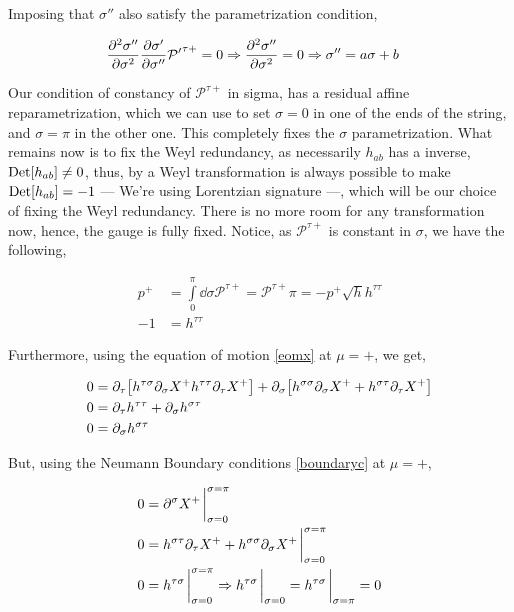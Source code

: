 Imposing that $\sigma''$ also satisfy the parametrization condition,

\begin{align*}
    {\pdv[2]{\sigma''}{\sigma}}{\pdv{\sigma'}{\sigma''}}{\mathcal P'}^{\tau+}&=0\Rightarrow {\pdv[2]{\sigma''}{\sigma}}=0\Rightarrow \sigma''=a\sigma+b
\end{align*}

Our condition of constancy of $\mathcal P^{\tau+}$ in sigma, has a residual affine reparametrization, which we can use to set $\sigma=0$ in one of the ends of the 
string, and $\sigma=\pi$ in the other one. This completely fixes the $\sigma$ parametrization. What remains now is to fix the Weyl redundancy, as necessarily 
$h_{ab}$ has a inverse, $\textup{Det} \qty[h_{ab}]\neq 0$, thus, by a Weyl transformation is always possible to make $\textup{Det} \qty[h_{ab}]=-1$ --- We're using Lorentzian signature ---, which 
will be our choice of fixing the Weyl redundancy. There is 
no more room for any transformation now, hence, the gauge is fully fixed. Notice, as $\mathcal P^{\tau+}$ is constant in $\sigma$, we have the following,

\begin{align*}
    p^+&=\int\limits_0^\pi\dd{\sigma}\mathcal P^{\tau+}=\mathcal P^{\tau+}\pi=-p^+\sqrt h h^{\tau\tau}\\
    -1&=h^{\tau\tau}
\end{align*}

Furthermore, using the equation of motion \ref{eomx} at $\mu=+$, we get,

\begin{align*}
    0&=\partial_\tau\qty[h^{\tau\sigma}\partial_\sigma X^+h^{\tau\tau}\partial_\tau X^+]+\partial_\sigma\qty[h^{\sigma\sigma}\partial_\sigma X^++h^{\sigma\tau}\partial_\tau X^+]\\
    0&=\partial_\tau h^{\tau\tau}+\partial_\sigma h^{\sigma\tau}\\
    0&=\partial_\sigma h^{\sigma\tau}
\end{align*}

But, using the Neumann Boundary conditions \ref{boundaryc} at $\mu=+$,

\begin{align*}
    0&=\partial^\sigma X^+\eval_{\sigma=0}^{\sigma=\pi}\\
    0&=h^{\sigma\tau}\partial_\tau X^++h^{\sigma\sigma}\partial_\sigma X^+\eval_{\sigma=0}^{\sigma=\pi}\\
    0&=h^{\tau\sigma}\eval_{\sigma=0}^{\sigma=\pi}\Rightarrow h^{\tau\sigma}\eval_{\sigma=0}=h^{\tau\sigma}\eval_{\sigma=\pi}=0
\end{align*}

